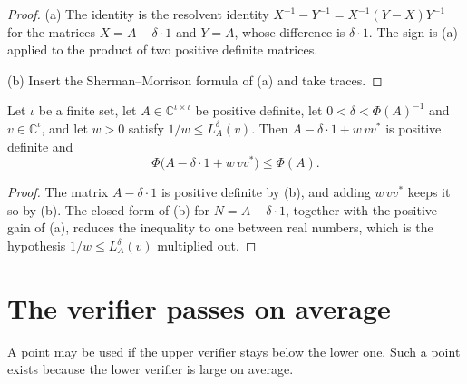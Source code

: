 \begin{proof}
\leanok
{}
(a) The identity is the resolvent identity $X^{-1} - Y^{-1} = X^{-1} (Y - X) Y^{-1}$ for
the matrices $X = A - \delta \cdot 1$ and $Y = A$, whose difference is $\delta \cdot 1$. The
sign is (a) applied to the product of two positive definite
matrices.

(b) Insert the Sherman--Morrison formula of (a) and take
traces.
\end{proof}

\begin{lemma}
\label{lem:lower-barrier}
\leanok
{}
Let $\iota$ be a finite set, let $A \in \mathbb{C}^{\iota \times \iota}$ be positive
definite, let $0 < \delta < \Phi(A)^{-1}$ and $v \in \mathbb{C}^{\iota}$, and let $w > 0$
satisfy $1/w \leq L_A^{\delta}(v)$. Then $A - \delta \cdot 1 + w \, v v^*$ is positive
definite and
\[
  \Phi \bigl( A - \delta \cdot 1 + w \, v v^* \bigr) \leq \Phi(A).
\]
\end{lemma}

\begin{proof}
\leanok
{}
The matrix $A - \delta \cdot 1$ is positive definite by (b),
and adding $w \, v v^*$ keeps it so by (b). The closed form of
(b) for $N = A - \delta \cdot 1$, together with the positive
gain of (a), reduces the inequality to one between real
numbers, which is the hypothesis $1/w \leq L_A^{\delta}(v)$ multiplied out.
\end{proof}

\section{The verifier passes on average}

A point may be used if the upper verifier stays below the lower one. Such a point exists
because the lower verifier is large on average.

